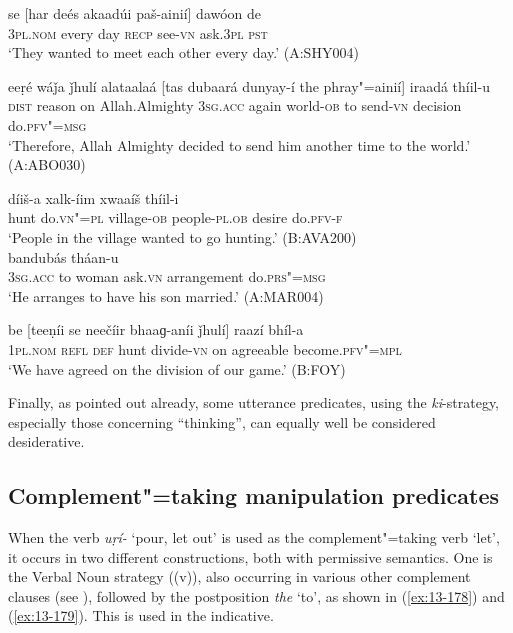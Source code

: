 \begin{exe}
\ex
\label{ex:13-173}
\gll se [har deés akaadúi paš-ainií] dawóon de \\
\textsc{3pl.nom} every day \textsc{recp} see-\textsc{vn} ask.\textsc{3pl} \textsc{pst} \\
\glt `They wanted to meet each other every day.' (A:SHY004)

\ex
\label{ex:13-174}
\gll eeṛé wáǰa ǰhulí alataalaá [tas dubaará dunyay-í  the phray"=ainií] iraadá thíil-u \\
\textsc{dist} reason on Allah.Almighty \textsc{3sg.acc} again world-\textsc{ob}  to send-\textsc{vn} decision do.\textsc{pfv"=msg}  \\
\glt `Therefore, Allah Almighty decided to send him another time to the world.' (A:ABO030)

\ex
\label{ex:13-175}
 díiš-a xalk-íim xwaaíš thíil-i \\
hunt do.\textsc{vn"=pl} village-\textsc{ob} people-\textsc{pl.ob} desire do.\textsc{pfv-f} \\
\glt `People in the village wanted to go hunting.' (B:AVA200) \\

\ex
\label{ex:13-176}
 bandubás tháan-u \\
\textsc{3sg.acc} to woman ask.\textsc{vn}  arrangement do.\textsc{prs"=msg} \\
\glt `He arranges to have his son married.' (A:MAR004)

\ex
\label{ex:13-177}
\gll be [teeṇíi se neečíir bhaaɡ-aníi ǰhulí]  raazí bhíl-a \\
\textsc{1pl.nom} \textsc{refl} \textsc{def} hunt divide-\textsc{vn} on agreeable become.\textsc{pfv"=mpl} \\
\glt `We have agreed on the division of our game.' (B:FOY) 
\end{exe}

Finally, as pointed out already, some utterance predicates, using the \textit{ki}-strategy, especially those concerning ``thinking'', can equally well be considered desiderative.


\subsection{Complement"=taking manipulation predicates}
\label{subsec:13-5-3}

 When the verb \textit{uṛí-} `pour, let out' is used as the complement"=taking verb `let', it occurs in two different constructions, both with permissive semantics. One is the Verbal Noun strategy ((v)), also occurring in various other complement clauses (see ), followed by the postposition \textit{the} `to', as shown in (\ref{ex:13-178}) and (\ref{ex:13-179}). This is used in the indicative.


